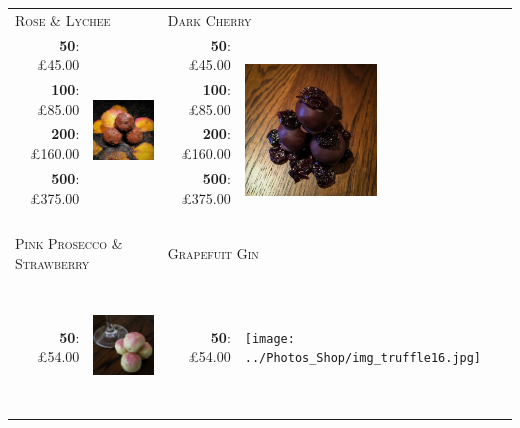 \documentclass[11pt, english]{article}
\begin{document}
	\begin{table}[h]
	\begin{center}
	\begin{tabular}{r|p{4cm}r|p{4cm}}
		\multicolumn{2}{l}{\textsc{Rose \& Lychee}} & \multicolumn{2}{l}{\textsc{Dark Cherry}}\\
		\textbf{50}: \pounds45.00 & \multirow{8}{*}{\includegraphics[width=3.5cm,height=3.5cm]{../Photos_Shop/img_truffle14.jpg}} & \textbf{50}: \pounds45.00 & \multirow{8}{*}{\includegraphics[width=3.5cm,height=3.5cm]{../Photos_Shop/img_truffle15.jpg}}\\
		\textbf{100}: \pounds85.00 & & \textbf{100}: \pounds85.00 & \\
		\textbf{200}: \pounds160.00 & & \textbf{200}: \pounds160.00 & \\
		\textbf{500}: \pounds375.00 & & \textbf{500}: \pounds375.00 & \\
		\multicolumn{4}{l}{}\\
		\multicolumn{4}{l}{}\\
		\multicolumn{4}{l}{}\\
		\multicolumn{4}{l}{}\\
		\multicolumn{2}{l}{\textsc{Pink Prosecco \& Strawberry}} & \multicolumn{2}{l}{\textsc{Grapefuit Gin}}\\
		\textbf{50}: \pounds54.00 & \multirow{5}{*}{\includegraphics[width=3.5cm,height=3.5cm]{../Photos_Shop/img_truffle4.jpg}} & \textbf{50}: \pounds54.00 & \multirow{5}{*}{\texttt{[image: ../Photos\_Shop/img\_truffle16.jpg]}}\\

\end{tabular}
\end{center}
\end{table}
\end{document}
